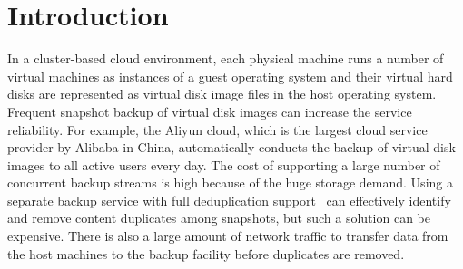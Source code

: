 \section{Introduction}
In a cluster-based cloud environment,
each physical machine runs a number  of virtual machines as  instances of a guest operating system 
and their  virtual hard disks are represented as virtual disk image files in the host operating system.
Frequent  snapshot backup of virtual disk images  can increase  the service reliability. 
For example, the Aliyun cloud, which is  the largest cloud service provider by Alibaba in China, 
automatically conducts  the backup of virtual disk images to all active users every day.
The cost of supporting a large number of concurrent backup streams is high
because of the huge storage demand. 
Using a separate  backup service with full deduplication support~\cite{venti02,bottleneck08}
can effectively identify and remove content duplicates among snapshots, 
but such a solution can be expensive. There is also a large amount of 
network traffic to transfer  data from the host machines to the backup facility
before duplicates are removed.



